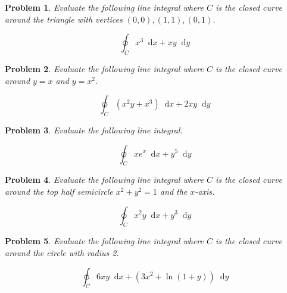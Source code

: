 \documentclass[11pt]{article}
\newtheorem{problem}{Problem}
\newcommand*\dif{\mathop{}\!\mathrm{d}}
\begin{document}
\begin{problem}
    Evaluate the following line integral where $C$ is the closed curve around the triangle with vertices $(0,0),(1,1), (0,1)$.

    \begin{equation*}
        \oint_C x^3 \dif{x} + xy \dif{y}
    \end{equation*}
\end{problem}


\vspace{7cm}

\begin{problem}
    Evaluate the following line integral where $C$ is the closed curve around $y=x$ and $y=x^2$.

    \begin{equation*}
        \oint_C (x^2y+x^3) \dif{x} + 2xy \dif{y}
    \end{equation*}
\end{problem}


\vspace{8cm}

\begin{problem}
    Evaluate the following line integral.

    \begin{equation*}
        \oint_C xe^x \dif{x} + y^5 \dif{y}
    \end{equation*}
\end{problem}


\vspace{6cm}



\begin{problem}
    Evaluate the following line integral where $C$ is the closed curve around the top half semicircle $x^2+y^2=1$ and the $x$-axis.

    \begin{equation*}
        \oint_C x^2y \dif{x} + y^3 \dif{y}
    \end{equation*}
\end{problem}

\vspace{10cm}

\begin{problem}
    Evaluate the following line integral where $C$ is the closed curve around the circle with radius 2.

    \begin{equation*}
        \oint_C 6xy \dif{x} + (3x^2+\ln{(1+y)}) \dif{y}
    \end{equation*}
\end{problem}
\end{document}
